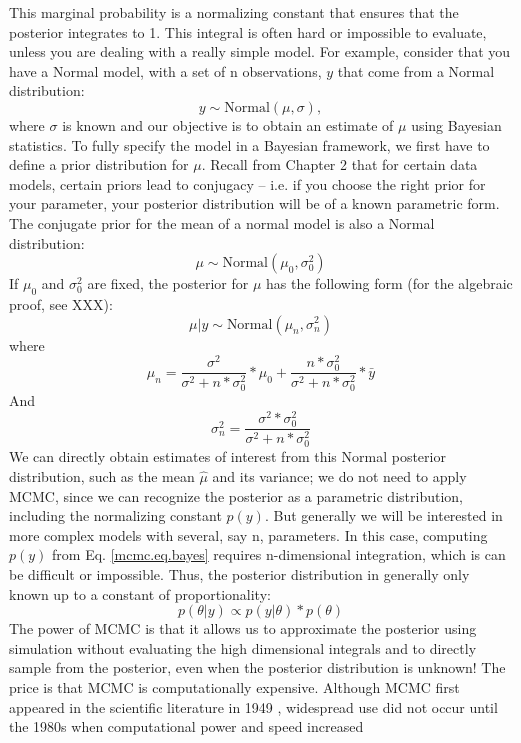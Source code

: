 This marginal probability is a normalizing constant that ensures that
the posterior integrates to 1. This
integral is often hard or impossible to evaluate, unless you are
dealing with a really simple model.  For example, consider that you
have a Normal model, with a set of n observations, $y$ that come from a
Normal distribution:
\[
 y \sim \mbox{Normal}(\mu, \sigma),
\]
where $\sigma$ is known and our objective is to obtain an estimate of
$\mu$ using Bayesian statistics. To fully specify the model in a Bayesian
framework, we first have to define a prior distribution for $\mu$. Recall
from Chapter 2 that for certain data models, certain priors lead to
conjugacy – i.e. if you choose the right prior for your parameter,
your posterior distribution will be of a known parametric form. The
conjugate prior for the mean of a normal model is also a Normal
distribution:
\[
\mu \sim \mbox{Normal}(\mu_0, \sigma_{0}^{2})
\]
If $\mu_{0}$ and $\sigma_{0}^{2}$ are fixed, the posterior for $\mu$ has the following form (for the algebraic proof, see XXX):
\begin{equation}
\mu|y \sim \mbox{Normal}(\mu_{n}, \sigma_{n}^{2})
\label{mcmc.eq.mu-posterior}
\end{equation}
where
\[
\mu_{n} = \frac{ \sigma^{2}}  {\sigma^{2}   +n* \sigma_{0}^{2}}*  \mu_0 +      \frac{n * \sigma_{0}^{2}}  {\sigma^{2}   +n* \sigma_{0}^{2}} *\bar{y}
\]
And
\[
 \sigma_{n}^{2} = \frac{\sigma^{2}  * \sigma_{0}^{2}} {\sigma^{2} + n*\sigma_{0}^{2}}
\]
We can directly obtain estimates of interest from this Normal
posterior distribution, such as the mean $\hat{\mu}$ and its variance; we
do not need to apply MCMC, since we can recognize the posterior as a
parametric distribution, including the normalizing constant $p(y)$.
But generally we will be interested in more complex models with
several, say n, parameters. In this case, computing $p(y)$ from
Eq. \ref{mcmc.eq.bayes} requires n-dimensional integration, which is
can be difficult or impossible. Thus, the posterior distribution in
generally only known up to a constant of proportionality:
\[
p(\theta|y) \propto p(y|\theta) * p(\theta)
\]
The power of MCMC is that it allows us to approximate the posterior
using simulation without evaluating the high dimensional integrals and
to directly sample from the posterior, even when the posterior
distribution is unknown! The price is that MCMC is computationally
expensive. Although MCMC first appeared in the scientific literature
in 1949 \citep{metropolis_etal:1949}, widespread use did not occur
until the 1980s when computational power and speed increased
